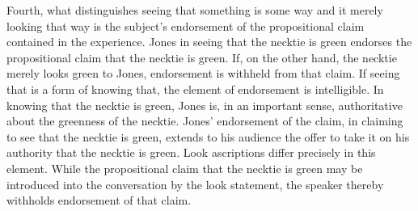 \documentclass[12pt]{article}
\begin{document}
Fourth, what distinguishes seeing that something is some way and it merely looking that way is the subject's endorsement of the propositional claim contained in the experience. Jones in seeing that the necktie is green endorses the propositional claim that the necktie is green. If, on the other hand, the necktie merely looks green to Jones, endorsement is withheld from that claim. If seeing that is a form of knowing that, the element of endorsement is intelligible. In knowing that the necktie is green, Jones is, in an important sense, authoritative about the greenness of the necktie. Jones' endorsement of the claim, in claiming to see that the necktie is green, extends to his audience the offer to take it on his authority that the necktie is green. Look ascriptions differ precisely in this element. While the propositional claim that the necktie is green may be introduced into the conversation by the look statement, the speaker thereby withholds endorsement of that claim. 
\end{document}
